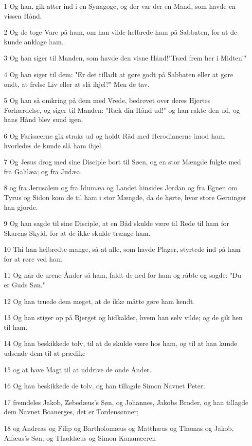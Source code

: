\par 1 Og han, gik atter ind i en Synagoge, og der var der en Mand, som havde en vissen Hånd.
\par 2 Og de toge Vare på ham, om han vilde helbrede ham på Sabbaten, for at de kunde anklage ham.
\par 3 Og han siger til Manden, som havde den visne Hånd!"Træd frem her i Midten!"
\par 4 Og han siger til dem: "Er det tilladt at gøre godt på Sabbaten eller at gøre ondt, at frelse Liv eller at slå ihjel?" Men de tav.
\par 5 Og han så omkring på dem med Vrede, bedrøvet over deres Hjertes Forhærdelse, og siger til Manden: "Ræk din Hånd ud!" og han rakte den ud, og hans Hånd blev sund igen.
\par 6 Og Farisæerne gik straks ud og holdt Råd med Herodianerne imod ham, hvorledes de kunde slå ham ihjel.
\par 7 Og Jesus drog med sine Disciple bort til Søen, og en stor Mængde fulgte med fra Galilæa; og fra Judæa
\par 8 og fra Jerusalem og fra Idumæa og Landet hinsides Jordan og fra Egnen om Tyrus og Sidon kom de til ham i stor Mængde, da de hørte, hvor store Gerninger han gjorde.
\par 9 Og han sagde til sine Disciple, at en Båd skulde være til Rede til ham for Skarens Skyld, for at de ikke skulde trænge ham.
\par 10 Thi han helbredte mange, så at alle, som havde Plager, styrtede ind på ham for at røre ved ham.
\par 11 Og når de urene Ånder så ham, faldt de ned for ham og råbte og sagde: "Du er Guds Søn."
\par 12 Og han truede dem meget, at de ikke måtte gøre ham kendt.
\par 13 Og han stiger op på Bjerget og hidkalder, hvem han selv vilde; og de gik hen til ham.
\par 14 Og han beskikkede tolv, til at de skulde være hos ham, og til at han kunde udsende dem til at prædike
\par 15 og at have Magt til at uddrive de onde Ånder.
\par 16 Og han beskikkede de tolv, og han tillagde Simon Navnet Peter;
\par 17 fremdeles Jakob, Zebedæus's Søn, og Johannes, Jakobs Broder, og han tillagde dem Navnet Boanerges, det er Tordensønner;
\par 18 og Andreas og Filip og Bartholomæus og Matthæus og Thomas og Jakob, Alfæus's Søn, og Thaddæus og Simon Kananæeren
